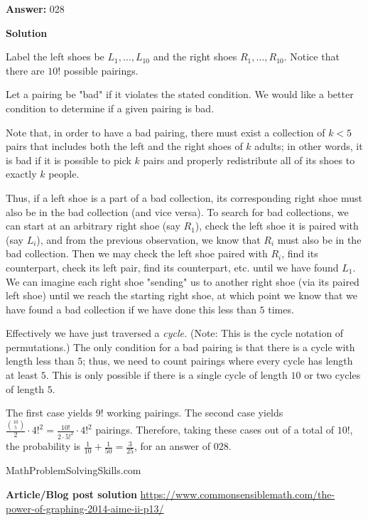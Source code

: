 \begin{enumerate}
 
 \textbf{Answer: }028



\textbf{Solution}

Label the left shoes be $L_1,\dots, L_{10}$ and the right shoes $R_1,\dots, R_{10}$. Notice that there are $10!$ possible pairings.

 
Let a pairing be "bad" if it violates the stated condition. We would like a better condition to determine if a given pairing is bad.

 
Note that, in order to have a bad pairing, there must exist a collection of $k<5$ pairs that includes both the left and the right shoes of $k$ adults; in other words, it is bad if it is possible to pick $k$ pairs and properly redistribute all of its shoes to exactly $k$ people.

 
Thus, if a left shoe is a part of a bad collection, its corresponding right shoe must also be in the bad collection (and vice versa). To search for bad collections, we can start at an arbitrary right shoe (say $R_1$), check the left shoe it is paired with (say $L_i$), and from the previous observation, we know that $R_i$ must also be in the bad collection. Then we may check the left shoe paired with $R_i$, find its counterpart, check its left pair, find its counterpart, etc. until we have found $L_1$. We can imagine each right shoe "sending" us to another right shoe (via its paired left shoe) until we reach the starting right shoe, at which point we know that we have found a bad collection if we have done this less than $5$ times. 

 
Effectively we have just traversed a \textit{cycle.} (Note: This is the cycle notation of permutations.) The only condition for a bad pairing is that there is a cycle with length less than $5$; thus, we need to count pairings where every cycle has length at least $5$. This is only possible if there is a single cycle of length $10$ or two cycles of length $5$. 

 
The first case yields $9!$ working pairings. The second case yields $\frac{{10\choose 5}}{2}\cdot{4!}^2=\frac{10!}{2 \cdot {5!}^2} \cdot {4!}^2$ pairings. Therefore, taking these cases out of a total of $10!$, the probability is $\frac{1}{10}+\frac{1}{50} = \frac{3}{25}$, for an answer of $\boxed{028}$.

 


 MathProblemSolvingSkills.com

 


 \textbf{Article/Blog post solution} \href{https://www.commonsensiblemath.com/the-power-of-graphing-2014-aime-ii-p13/}{https://www.commonsensiblemath.com/the-power-of-graphing-2014-aime-ii-p13/}


\end{enumerate}
